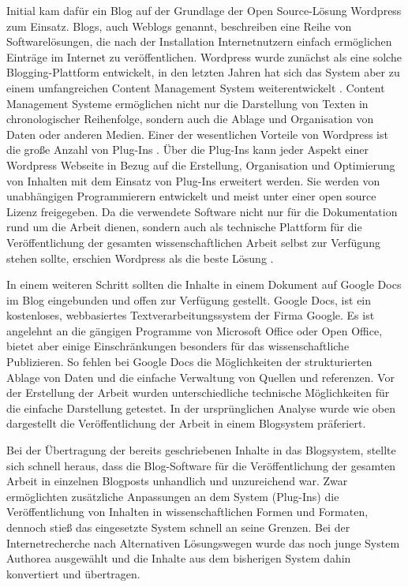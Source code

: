 Initial kam dafür ein Blog auf der Grundlage der Open Source-Lösung Wordpress zum Einsatz. Blogs, auch Weblogs genannt, beschreiben eine Reihe von Softwarelösungen, die nach der Installation Internetnutzern einfach ermöglichen Einträge im Internet zu veröffentlichen. Wordpress wurde zunächst als eine solche Blogging-Plattform entwickelt, in den letzten Jahren hat sich das System aber zu einem umfangreichen Content Management System weiterentwickelt \cite{Patel_2011_cms}. Content Management Systeme ermöglichen nicht nur die Darstellung von Texten in chronologischer Reihenfolge, sondern auch die Ablage und Organisation von Daten oder anderen Medien. Einer der wesentlichen Vorteile von Wordpress ist die große Anzahl von Plug-Ins \cite{Patel_2011_cms}. Über die Plug-Ins kann jeder Aspekt einer Wordpress Webseite in Bezug auf die Erstellung, Organisation und Optimierung von Inhalten mit dem Einsatz von Plug-Ins erweitert werden. Sie werden von unabhängigen Programmierern entwickelt und meist unter einer open source Lizenz freigegeben. Da die verwendete Software nicht nur für die Dokumentation rund um die Arbeit dienen, sondern auch als technische Plattform für die Veröffentlichung der gesamten wissenschaftlichen Arbeit selbst zur Verfügung stehen sollte, erschien Wordpress als die beste Lösung \cite{Jones_2013_CMS}.

In einem weiteren Schritt sollten die Inhalte in einem Dokument auf Google Docs im Blog eingebunden und offen zur Verfügung gestellt. Google Docs, ist ein kostenloses, webbasiertes Textverarbeitungssystem der Firma Google. Es ist angelehnt an die gängigen Programme von Microsoft Office oder Open Office, bietet aber einige Einschränkungen besonders für das wissenschaftliche Publizieren. So fehlen bei Google Docs die Möglichkeiten der strukturierten Ablage von Daten und die einfache Verwaltung von Quellen und referenzen. Vor der Erstellung der Arbeit wurden unterschiedliche technische Möglichkeiten für die einfache Darstellung getestet. In der ursprünglichen Analyse wurde wie oben dargestellt die Veröffentlichung der Arbeit in einem Blogsystem präferiert.

Bei der Übertragung der bereits geschriebenen Inhalte in das Blogsystem, stellte sich schnell heraus, dass die Blog-Software für die Veröffentlichung der gesamten Arbeit in einzelnen Blogposts unhandlich und unzureichend war. Zwar ermöglichten zusätzliche Anpassungen an dem System (Plug-Ins) die Veröffentlichung von Inhalten in wissenschaftlichen Formen und Formaten, dennoch stieß das eingesetzte System schnell an seine Grenzen. Bei der Internetrecherche nach Alternativen Lösungswegen wurde das noch junge System Authorea ausgewählt und die Inhalte aus dem bisherigen System dahin konvertiert und übertragen.

